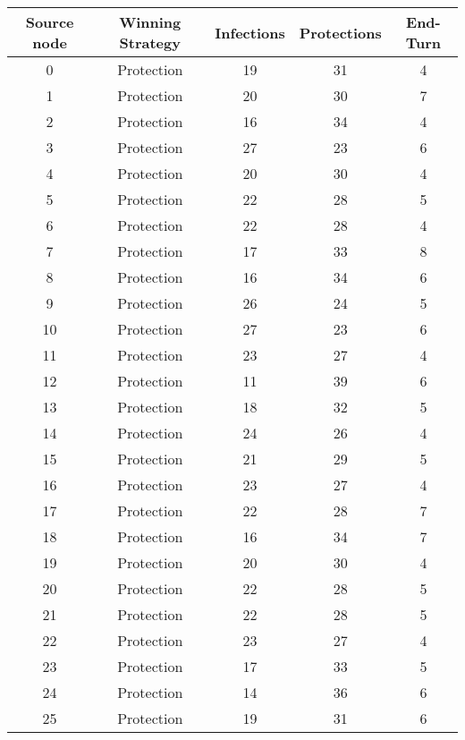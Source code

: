 \documentclass[results.tex]{subfiles}
\begin{document}
\begin{center}
  \begin{tabular}{| c || c | c | c | c |}
    \hline
    {\bfseries Source node} & {\bfseries Winning Strategy} & {\bfseries Infections} & {\bfseries Protections} & {\bfseries End-Turn} \\  %
    \hline\hline
    0 & Protection & 19 & 31 & 4 \\ 
    \hline
    1 & Protection & 20 & 30 & 7 \\ 
    \hline
    2 & Protection & 16 & 34 & 4 \\ 
    \hline
    3 & Protection & 27 & 23 & 6 \\ 
    \hline
    4 & Protection & 20 & 30 & 4 \\ 
    \hline
    5 & Protection & 22 & 28 & 5 \\ 
    \hline
    6 & Protection & 22 & 28 & 4 \\ 
    \hline
    7 & Protection & 17 & 33 & 8 \\ 
    \hline
    8 & Protection & 16 & 34 & 6 \\ 
    \hline
    9 & Protection & 26 & 24 & 5 \\ 
    \hline
    10 & Protection & 27 & 23 & 6 \\ 
    \hline
    11 & Protection & 23 & 27 & 4 \\ 
    \hline
    12 & Protection & 11 & 39 & 6 \\ 
    \hline
    13 & Protection & 18 & 32 & 5 \\ 
    \hline
    14 & Protection & 24 & 26 & 4 \\ 
    \hline
    15 & Protection & 21 & 29 & 5 \\ 
    \hline
    16 & Protection & 23 & 27 & 4 \\ 
    \hline
    17 & Protection & 22 & 28 & 7 \\ 
    \hline
    18 & Protection & 16 & 34 & 7 \\ 
    \hline
    19 & Protection & 20 & 30 & 4 \\ 
    \hline
    20 & Protection & 22 & 28 & 5 \\ 
    \hline
    21 & Protection & 22 & 28 & 5 \\ 
    \hline
    22 & Protection & 23 & 27 & 4 \\ 
    \hline
    23 & Protection & 17 & 33 & 5 \\ 
    \hline
    24 & Protection & 14 & 36 & 6 \\ 
    \hline
    25 & Protection & 19 & 31 & 6 \\ 

\end{tabular}
\end{center}
\end{document}
